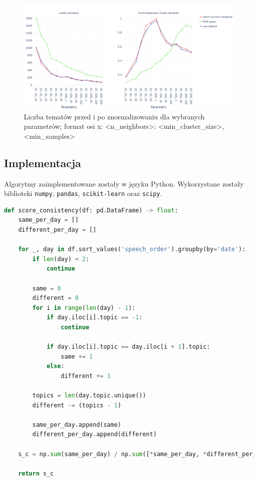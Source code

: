 		\begin{figure}[htb]
			\centering
			\includegraphics[width=\linewidth]{rys05/topic_counts.png}
			\caption{Liczba tematów przed i po znormalizowaniu dla wybranych parametrów; format osi x: <n\_neighbors>: <min\_cluster\_size>, <min\_samples>}\label{fig:topic_counts}
		\end{figure}

	\subsection{Implementacja}
		Algorytmy zaimplementowane zostały w języku Python.
		Wykorzystane zostały biblioteki \verb|numpy|, \verb|pandas|, \verb|scikit-learn| oraz \verb|scipy|.

		\begin{lstlisting}[label=lst:score_consistency,language=Python,caption=Funkcja obliczająca spójność s\_c]
def score_consistency(df: pd.DataFrame) -> float:
	same_per_day = []
	different_per_day = []

	for _, day in df.sort_values('speech_order').groupby(by='date'):
		if len(day) < 2:
			continue

		same = 0
		different = 0
		for i in range(len(day) - 1):
			if day.iloc[i].topic == -1:
				continue

			if day.iloc[i].topic == day.iloc[i + 1].topic:
				same += 1
			else:
				different += 1

		topics = len(day.topic.unique())
		different -= (topics - 1)

		same_per_day.append(same)
		different_per_day.append(different)

	s_c = np.sum(same_per_day) / np.sum([*same_per_day, *different_per_day])

	return s_c
		\end{lstlisting}

